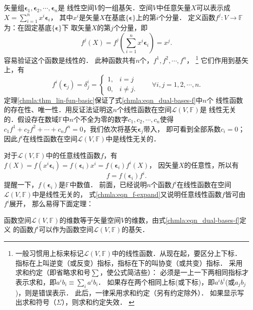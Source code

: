 矢量组$\boldsymbol{\epsilon}_1,\boldsymbol{\epsilon}_2,\cdots,\boldsymbol{\epsilon}_n$是
线性空间$V$的一组基矢．空间$V$中任意矢量$X$可以表示成
$X= \sum_{i=1}^{n} x^i \boldsymbol{\epsilon}_i$，
其中$x^i$是矢量$X$在基底$\{\boldsymbol{\epsilon}\}$上的第$i$个分量．
定义函数$f^j:V\to \mathbb{F}$为：在固定基底$\{\boldsymbol{\epsilon}\}$下
取矢量$X$的第$j$个分量，即
\begin{equation}\label{chmla:eqn_fjx}
    f^j(X)=f^j\left(\sum_{i=1}^{n} x^i \boldsymbol{\epsilon}_i\right)=x^j .
\end{equation}
容易验证这个函数是线性的．
此种函数共有$n$个，$f^1,f^2,\cdots,f^n$，
{\footnote{一般习惯用上标来标记$\mathscr{L}(V,\mathbb{F})$中的线性函数．从现在起，要区分上下标．
        指标在上叫逆变（或反变）指标，指标在下的叫协变（或共变）指标．
        采用{\heiti 求和约定}（即省略求和号$\sum$，使公式简洁些）：
        必须是一上一下两相同指标才表示求和，即$a^i b_i \equiv \sum_{i}a^i b_i$．
        如果存在两个相同上标(或下标)，即$a^i b^i$(或$a_j b_j$)，则是错误表示．
        此后，一律采用求和约定（另有约定除外）．
        如果显示写出求和符号（$\Sigma$），则求和约定失效．
        \label{chmla:ft_einstein-sum}}}
它们作用到基矢上，有
\begin{equation} \label{chmla:eqn_dual-bases-f}
    f^i(\boldsymbol{\epsilon}_j) = \delta^i _j =
    \begin{cases}
        1,& i=j \\ 0, & i\neq j.
    \end{cases}
    \qquad \forall i,j = 1,2,\cdots,n.
\end{equation}
定理\ref{chmla:thm_lin-fun-basic}保证了式\eqref{chmla:eqn_dual-bases-f}中$n$个
线性函数的存在性、唯一性．用反证法证明这$n$个线性函数在空间$\mathscr{L}(V,\mathbb{F})$是
线性无关的．假设存在数域$\mathbb{F}$中$n$个不全为零的数字$c_1,c_2,\cdots,c_n$使得
$c_1 f^1 + c_2 f^2 + \cdots + c_n f^n =0$，我们依次将基矢$\boldsymbol{\epsilon}_j$带入，
即可看到全部系数$c_i=0$；因此$f^i$在线性函数在空间$\mathscr{L}(V,\mathbb{F})$中是线性无关的．

对于$\mathscr{L}(V,\mathbb{F})$中的任意线性函数$f$，有
$f(X) = f(x^i \boldsymbol{\epsilon}_i) = f( \boldsymbol{\epsilon}_i)x^i
    =f( \boldsymbol{\epsilon}_i)f^i (X)$，
因矢量$X$的任意性，所以有
    \begin{equation}\label{chmla:eqn_f-expand}
        f = f( \boldsymbol{\epsilon}_i)f^i.
    \end{equation}
提醒一下，$f( \boldsymbol{\epsilon}_i)$是$\mathbb{F}$中数值．
前面，已经说明$n$个函数$f^i$在线性函数在空间$\mathscr{L}(V,\mathbb{F})$中是线性无关的，
式\eqref{chmla:eqn_f-expand}又说明任意线性函数$f$皆可由$f^i$展开，
那么易得下面定理：
\begin{theorem}
    函数空间$\mathscr{L}(V,\mathbb{F})$的维数等于矢量空间$V$的维数，由式\eqref{chmla:eqn_dual-bases-f}定义
    的函数$f^i$可以作为函数空间$\mathscr{L}(V,\mathbb{F})$的基矢．
\end{theorem}

